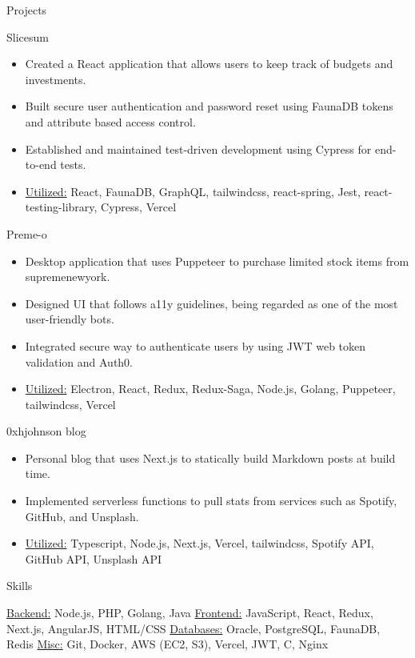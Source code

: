 \documentclass[calibri]{mcdowellcv}
\begin{document}
	\begin{cvsection}{Projects}
		\begin{cvsubsection}{Slicesum}{}{}
			\begin{itemize}
        \item Created a React application that allows users to keep track of budgets and investments.
        \item Built secure user authentication and password reset using FaunaDB tokens and attribute based access control.
        \item Established and maintained test-driven development using Cypress for end-to-end tests.
				\item \underline{Utilized:} React, FaunaDB, GraphQL, tailwindcss, react-spring, Jest, react-testing-library, Cypress, Vercel
    	\end{itemize}
		\end{cvsubsection}

		\begin{cvsubsection}{Preme-o}{}{}
			\begin{itemize}
        \item Desktop application that uses Puppeteer to purchase limited stock items from supremenewyork.
        \item Designed UI that follows a11y guidelines, being regarded as one of the most user-friendly bots.
        \item Integrated secure way to authenticate users by using JWT web token validation and Auth0.
				\item \underline{Utilized:} Electron, React, Redux, Redux-Saga, Node.js, Golang, Puppeteer, tailwindcss, Vercel
    	\end{itemize}
		\end{cvsubsection}

		\begin{cvsubsection}{0xhjohnson blog}{}{}
			\begin{itemize}
        \item Personal blog that uses Next.js to statically build Markdown posts at build time.
        \item Implemented serverless functions to pull stats from services such as Spotify, GitHub, and Unsplash.
				\item \underline{Utilized:} Typescript, Node.js, Next.js, Vercel, tailwindcss, Spotify API, GitHub API, Unsplash API
    	\end{itemize}
		\end{cvsubsection}
	\end{cvsection}
	
	\begin{cvsection}{Skills}
		\begin{cvsubsection}{}{}{}	
				\underline{Backend:} Node.js, PHP, Golang, Java
				\hfill
				\underline{Frontend:} JavaScript, React, Redux, Next.js, AngularJS, HTML/CSS
				\underline{Databases:} Oracle, PostgreSQL, FaunaDB, Redis
				\hfill
				\underline{Misc:} Git, Docker, AWS (EC2, S3), Vercel, JWT, C, Nginx
		\end{cvsubsection}
	\end{cvsection}
	
\end{document}

